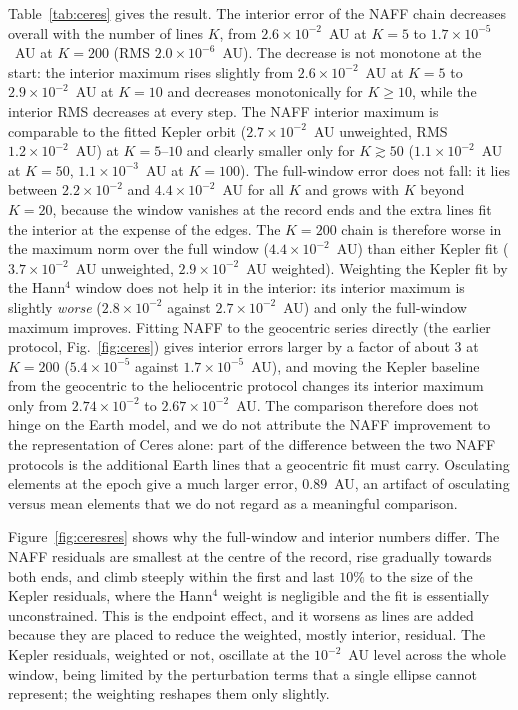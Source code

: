 Table~\ref{tab:ceres} gives the result. The interior error of the NAFF chain
decreases overall with the number of lines $K$, from $2.6\times10^{-2}$~AU at
$K=5$ to $1.7\times10^{-5}$~AU at $K=200$ (RMS $2.0\times10^{-6}$~AU). The
decrease is not monotone at the start: the interior maximum rises slightly from
$2.6\times10^{-2}$~AU at $K=5$ to $2.9\times10^{-2}$~AU at $K=10$ and decreases
monotonically for $K\ge10$, while the interior RMS decreases at every step. The NAFF interior maximum is
comparable to the fitted Kepler orbit ($2.7\times10^{-2}$~AU unweighted, RMS
$1.2\times10^{-2}$~AU) at $K=5$--$10$ and clearly smaller only for
$K\gtrsim50$ ($1.1\times10^{-2}$~AU at $K=50$, $1.1\times10^{-3}$~AU at
$K=100$). The full-window error does not fall: it lies between
$2.2\times10^{-2}$ and $4.4\times10^{-2}$~AU for all $K$ and grows with $K$ beyond
$K=20$, because the window vanishes at the record ends and the extra lines fit
the interior at the expense of the edges. The $K=200$ chain is therefore worse in
the maximum norm over the full window ($4.4\times10^{-2}$~AU) than either
Kepler fit ($3.7\times10^{-2}$~AU unweighted, $2.9\times10^{-2}$~AU weighted).
Weighting the Kepler fit by the Hann$^4$ window does not help it in the
interior: its interior maximum is slightly \emph{worse}
($2.8\times10^{-2}$ against $2.7\times10^{-2}$~AU) and only the full-window
maximum improves. Fitting NAFF to the geocentric series directly (the earlier
protocol, Fig.~\ref{fig:ceres}) gives interior errors larger by a factor of about $3$ at $K=200$ ($5.4\times10^{-5}$ against $1.7\times10^{-5}$~AU), and moving the Kepler baseline from the geocentric to the
heliocentric protocol changes its interior maximum only from
$2.74\times10^{-2}$ to $2.67\times10^{-2}$~AU. The comparison therefore does not
hinge on the Earth model, and we do not attribute the NAFF improvement to the
representation of Ceres alone: part of the difference between the two NAFF
protocols is the additional Earth lines that a geocentric fit must carry.
Osculating elements at the epoch give a much larger error, $0.89$~AU, an
artifact of osculating versus mean elements that we do not regard as a
meaningful comparison.

Figure~\ref{fig:ceresres} shows why the full-window and interior numbers
differ. The NAFF residuals are smallest at the centre of the record, rise
gradually towards both ends, and climb steeply within the first and last
$10\%$ to the size of the Kepler residuals, where the Hann$^4$ weight is
negligible and the fit is essentially unconstrained. This is the endpoint
effect, and it worsens as lines are added because they are placed to reduce the
weighted, mostly interior, residual. The Kepler residuals, weighted or not,
oscillate at the $10^{-2}$~AU level across the whole window, being limited by
the perturbation terms that a single ellipse cannot represent; the weighting
reshapes them only slightly.

